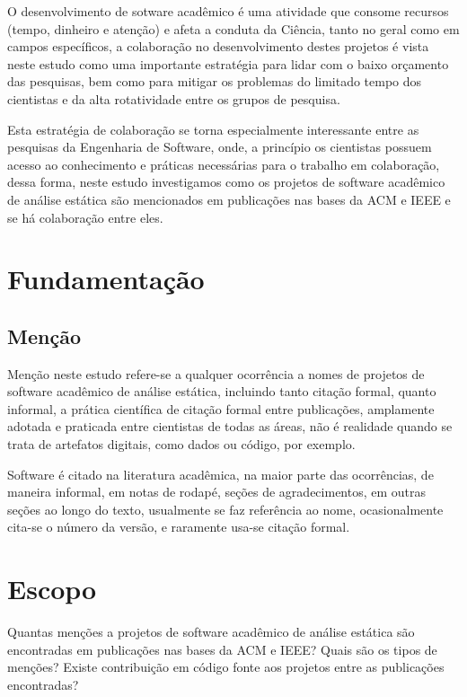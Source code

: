 O desenvolvimento de sotware acadêmico é uma atividade que consome recursos
(tempo, dinheiro e atenção) e afeta a conduta da Ciência, tanto no geral como
em campos específicos, a colaboração no desenvolvimento destes projetos é vista
neste estudo como uma importante estratégia para lidar com o baixo orçamento
das pesquisas, bem como para mitigar os problemas do limitado tempo dos
cientistas e da alta rotatividade entre os grupos de pesquisa.

Esta estratégia de colaboração se torna especialmente interessante entre as
pesquisas da Engenharia de Software, onde, a princípio os cientistas possuem
acesso ao conhecimento e práticas necessárias para o trabalho em colaboração,
dessa forma, neste estudo investigamos como os projetos de software acadêmico
de análise estática são mencionados em publicações nas bases da ACM e IEEE e se
há colaboração entre eles.


\section{Fundamentação} \label{estudo2:fundamentacao} %

\subsection{Menção}

Menção neste estudo refere-se a qualquer ocorrência a nomes de projetos de
software acadêmico de análise estática, incluindo tanto citação formal, quanto
informal, a prática científica de citação formal entre publicações, amplamente
adotada e praticada entre cientistas de todas as áreas, não é realidade quando
se trata de artefatos digitais, como dados ou código, por exemplo.

Software é citado na literatura acadêmica, na maior parte das ocorrências, de
maneira informal, em notas de rodapé, seções de agradecimentos, em outras
seções ao longo do texto, usualmente se faz referência ao nome, ocasionalmente
cita-se o número da versão, e raramente usa-se citação formal.


\section{Escopo} \label{estudo2:escopo} %

Quantas menções a projetos de software acadêmico de análise estática são
encontradas em publicações nas bases da ACM e IEEE? Quais são os tipos de
menções? Existe contribuição em código fonte aos projetos entre as publicações
encontradas?

